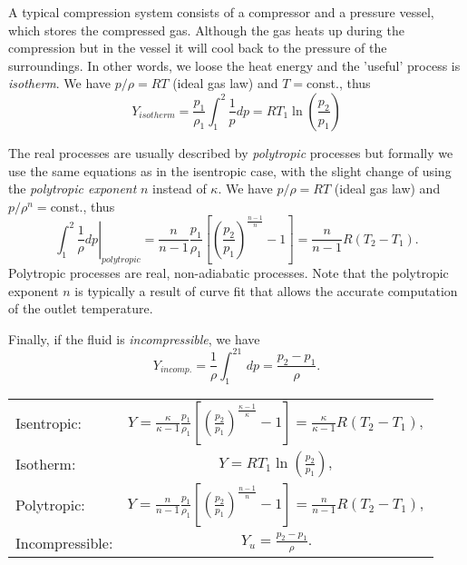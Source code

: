 A typical compression system consists of a compressor and a pressure vessel, which stores the compressed gas. Although the gas heats up during the compression but in the vessel it will cool back to the pressure of the surroundings. In other words, we loose the heat energy and the 'useful' process is \emph{isotherm}. We have $p/\rho=RT$ (ideal gas law) and $T=$const., thus
%
\begin{equation}
Y_{isotherm}=\frac{p_1}{\rho_1}\int_1^2\frac{1}{p}dp = R T_1 \ln\left( \frac{p_2}{p_1}\right)
\end{equation}

The real processes are usually described by \emph{polytropic} processes but formally we use the same equations as in the isentropic case, with the slight change of using the \emph{polytropic exponent} $n$ instead of $\kappa$. We have $p/\rho=RT$ (ideal gas law) and $p/\rho^n=$const., thus
%
\begin{equation}
\left.\int_1^2\frac{1}{\rho}dp\right|_{polytropic} = \frac{n}{n-1}\frac{p_1}{\rho_1} \left[\left(\frac{p_2}{p_1}\right)^{\frac{n-1}{n}}-1\right]=\frac{n}{n-1} R \left( T_2-T_1\right).
\label{eq:chap1_polytropic_specific_work}
\end{equation}
%
Polytropic processes are real, non-adiabatic processes. Note that the polytropic exponent $n$ is typically a result of curve fit that allows the accurate computation of the outlet temperature.

Finally, if the fluid is \emph{incompressible}, we have%
\begin{equation}
Y_{incomp.}=\frac{1}{\rho}\int_1^21\,dp =\frac{p_2-p_1}{\rho}.
\end{equation}

\begin{center}
	\begin{tabular}{lc}

	Isentropic: & $Y = \frac{\kappa}{\kappa-1}\frac{p_1}{\rho_1} \left[\left(\frac{p_2}{p_1}\right)^{\frac{\kappa-1}{\kappa}}-1\right] = \frac{\kappa}{\kappa-1} R \left(T_2-T_1\right),$ \\ [0.8cm]
	Isotherm: & $Y = R T_1 \ln\left( \frac{p_2}{p_1}\right),$\\[0.8cm]
	Polytropic: &  $Y = \frac{n}{n-1}\frac{p_1}{\rho_1} \left[\left(\frac{p_2}{p_1}\right)^{\frac{n-1}{n}}-1\right]=\frac{n}{n-1} R \left( T_2-T_1\right),$\\[0.8cm]
	Incompressible: & $Y_u = \frac{p_2-p_1}{\rho}.$\\[0.8cm]

	\end{tabular}
\end{center}


